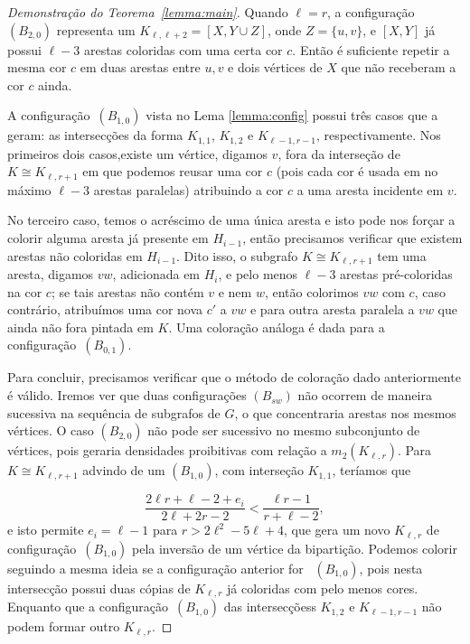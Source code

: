 \documentclass[11pt,twoside,a4paper]{book}
\newcommand{\K}{K_{\ell,r}} %
\theoremstyle{note}
\begin{document}
\begin{proof}[Demonstração do Teorema~\ref{lemma:main}]
        Quando $\ell = r$, a configuração~\hyperref[configB]{$(B_{2,0})$} representa um 
        $K_{\ell, \ell+2} = [X, Y \cup Z]$, onde $Z = \{u,v\}$, e $[X,Y]$ já possui $\ell-3$ arestas coloridas com uma certa cor $c$. 
        Então é suficiente repetir a mesma cor $c$ em duas arestas entre $u,v$ e dois vértices de $X$ que não receberam a cor $c$ ainda.
        
       A configuração~\hyperref[configB]{$(B_{1,0})$} vista no Lema \ref{lemma:config} possui três casos que a geram: 
       as intersecções da forma $K_{1,1}$, $K_{1,2}$ e $K_{\ell-1,r-1}$, respectivamente. 
       Nos primeiros dois casos,existe um vértice, digamos $v$,
        fora da interseção de $K \cong K_{\ell,r+1}$ em que podemos reusar uma
        cor $c$ (pois cada cor é usada em no máximo $\ell-3$ arestas paralelas) atribuindo a cor $c$ a uma aresta incidente em $v$.
                
        No terceiro caso, temos o acréscimo de uma única aresta e isto pode nos forçar a colorir alguma aresta já presente em $H_{i-1}$, então precisamos verificar que existem arestas não coloridas em $H_{i-1}$. 
        Dito isso, o subgrafo $K \cong K_{\ell,r+1}$ tem uma aresta, digamos $vw$, adicionada em $H_i$, e pelo menos $\ell-3$ arestas pré-coloridas na cor $c$;
        se tais arestas não contém $v$ e nem $w$, então colorimos $vw$ com $c$, caso contrário, atribuímos uma cor nova $c'$ a $vw$ e para outra aresta paralela a $vw$ que ainda não fora pintada em $K$.  
        Uma coloração análoga é dada para a configuração~\hyperref[configB]{$(B_{0,1})$}.
        
        Para concluir, precisamos verificar que o método de coloração dado anteriormente é válido.
        Iremos ver que duas configurações $(B_{sw})$ não ocorrem de maneira sucessiva na sequência de subgrafos  de $G$, o que concentraria arestas nos mesmos vértices. %
        O caso $(B_{2,0})$ não pode ser sucessivo no mesmo subconjunto de vértices, pois geraria densidades proibitivas com relação a $m_2(\K)$.
        Para $K \cong K_{\ell,r+1}$ advindo de um $(B_{1,0})$, com interseção $K_{1,1}$, teríamos que 
        
        \[
            \frac{2\ell r+\ell-2+e_i}{2\ell+2r-2} < \frac{\ell
r-1}{r+\ell-2},
        \]
        e isto permite $e_i = \ell-1$ para $r > 2\ell^2-5\ell+4$,
        que gera um novo $\K$ de configuração~\hyperref[configB]{$(B_{1,0})$} pela inversão de um vértice da bipartição.
         Podemos colorir seguindo a mesma ideia se a configuração anterior for ~\hyperref[configB]{$(B_{1,0})$}, pois nesta intersecção possui duas cópias de $\K$ já coloridas com pelo menos cores.
        Enquanto que a configuração~\hyperref[configB]{$(B_{1,0})$}
 das intersecçõess $K_{1,2}$ e $K_{\ell-1,r-1}$ não podem formar outro $\K$.  


\end{proof}
\end{document}
